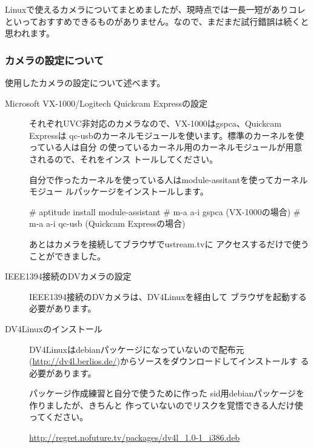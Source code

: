 \documentclass[mingoth,a4paper]{jsarticle}
\begin{document}
Linuxで使えるカメラについてまとめましたが、現時点では一長一短がありコレ
といっておすすめできるものがありません。なので、まだまだ試行錯誤は続くと
思われます。

\subsubsection{カメラの設定について}

使用したカメラの設定について述べます。

\begin{description}
 \item[Microsoft VX-1000/Logitech Quickcam Expressの設定] 

それぞれUVC非対応のカメラなので、VX-1000はgspca、Quickcam Expressは
qc-usbのカーネルモジュールを使います。標準のカーネルを使っている人は自分
の使っているカーネル用のカーネルモジュールが用意されるので、それをインス
トールしてください。

自分で作ったカーネルを使っている人はmodule-assitantを使ってカーネルモジュー
ルパッケージをインストールします。

\begin{commandline}
# aptitude install module-assistant
# m-a a-i gspca (VX-1000の場合)
# m-a a-i qc-usb (Quickcam Expressの場合)
\end{commandline}

あとはカメラを接続してブラウザでustream.tvに
アクセスするだけで使うことができました。

 \item[IEEE1394接続のDVカメラの設定]

IEEE1394接続のDVカメラは、DV4Linuxを経由して
ブラウザを起動する必要があります。

 \item[DV4Linuxのインストール]

DV4Linuxはdebianパッケージになっていないので配布元
(\url{http://dv4l.berlios.de/})からソースをダウンロードしてインストールす
る必要があります。

パッケージ作成練習と自分で使うために作った
sid用debianパッケージを作りましたが、きちんと
作っていないのでリスクを覚悟できる人だけ使ってください。

\url{http://regret.nofuture.tv/packages/dv4l_1.0-1_i386.deb}



\end{description}
\end{document}
